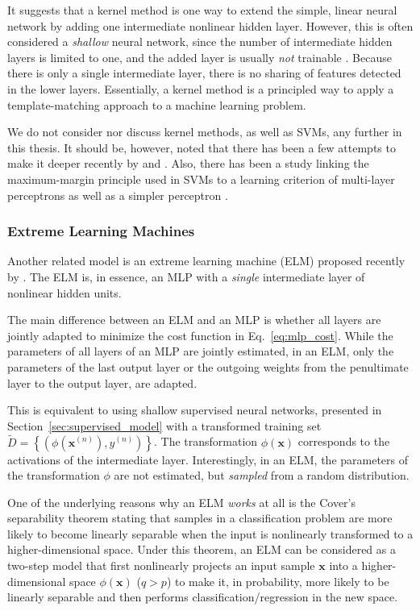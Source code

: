 \documentclass[dissertation,nocontribution,draft*]{aaltoseries}
\newcommand{\vect}[1]{\mathbf{#1}}
\newcommand{\vx}[0]{\vect{x}}
\begin{document}
It suggests that a kernel method is one way to extend the
simple, linear neural network by adding one intermediate
nonlinear hidden layer. However, this is often considered a
\textit{shallow} neural network, since the number of
intermediate hidden layers is limited to one, and the added
layer is usually \textit{not} trainable \citep{Bengio2007a}.
Because there is only a single intermediate layer, there is
no sharing of features detected in the lower layers.
Essentially, a kernel method is a principled way to apply a
template-matching approach to a machine learning problem.

We do not consider nor discuss kernel methods, as
well as SVMs, any further in this thesis.  It should be,
however, noted that there has been a few attempts to make it
deeper recently by \citet{Cho2009} and \citet{Damianou2012}.
Also, there has been a study linking the maximum-margin
principle used in SVMs to a learning criterion of
multi-layer perceptrons as well as a simpler perceptron
\citep[see, e.g.,][and references therein]{Collobert2004}.

\subsubsection{Extreme Learning Machines}
\label{sec:elm}

Another related model is an extreme learning machine
(ELM)
proposed recently by \citet{Huang2006}. The ELM is, in
essence, an MLP with a \textit{single} intermediate layer of
nonlinear hidden units.

The main difference between an ELM and an MLP is whether all
layers are jointly adapted to minimize the cost function in
Eq.~\eqref{eq:mlp_cost}. While the parameters of all layers
of an MLP are jointly estimated, in an ELM, only the
parameters of the last output layer or the outgoing weights
from the penultimate layer to the output layer, are adapted.

This is equivalent to using shallow supervised neural
networks, presented in Section~\ref{sec:supervised_model}
with a transformed training set $\tilde{D}=\left\{ \left(
\phi(\vx^{(n)}), y^{(n)} \right) \right\}$. The
transformation $\phi(\vx)$ corresponds to the activations of
the intermediate layer.  Interestingly, in an ELM, the
parameters of the transformation $\phi$ are not estimated,
but \textit{sampled} from a random distribution.

One of the underlying reasons why an ELM \textit{works} at
all is the Cover's separability theorem
\citep{Cover1965,Haykin2009} stating that samples in a
classification problem are more likely to become linearly separable when the
input is nonlinearly transformed to a higher-dimensional
space. Under this theorem, an ELM can be considered as a
two-step model that first nonlinearly projects an input
sample $\vx$ into a higher-dimensional space $\phi(\vx)$ ($q
> p$) to make it, in probability, more likely to be linearly
separable and then performs classification/regression in the
new space.
\end{document}
